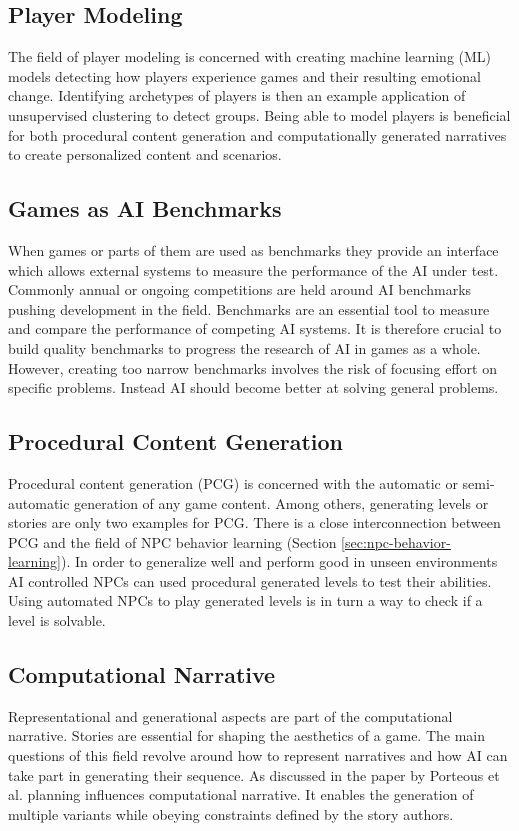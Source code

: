 \subsection{Player Modeling}
The field of player modeling is concerned with creating machine learning (ML) models detecting how players experience games and their resulting emotional change.
Identifying archetypes of players is then an example application of unsupervised clustering to detect groups.
Being able to model players is beneficial for both procedural content generation and computationally generated narratives to create personalized content and scenarios.

\subsection{Games as AI Benchmarks}
When games or parts of them are used as benchmarks they provide an interface which allows external systems to measure the performance of the AI under test.
Commonly annual or ongoing competitions are held around AI benchmarks pushing development in the field.
Benchmarks are an essential tool to measure and compare the performance of competing AI systems.
It is therefore crucial to build quality benchmarks to progress the research of AI in games as a whole.
However, creating too narrow benchmarks involves the risk of focusing effort on specific problems.
Instead AI should become better at solving general problems.

\subsection{Procedural Content Generation}
Procedural content generation (PCG) is concerned with the automatic or semi-automatic generation of any game content.
Among others, generating levels or stories are only two examples for PCG.
There is a close interconnection between PCG and the field of NPC behavior learning (Section \ref{sec:npc-behavior-learning}).
In order to generalize well and perform good in unseen environments AI controlled NPCs can used procedural generated levels to test their abilities.
Using automated NPCs to play generated levels is in turn a way to check if a level is solvable.

\subsection{Computational Narrative}
Representational and generational aspects are part of the computational narrative.
Stories are essential for shaping the aesthetics of a game.
The main questions of this field revolve around how to represent narratives and how AI can take part in generating their sequence.
As discussed in the paper by Porteous et al. \cite{Porteous2010} planning influences computational narrative.
It enables the generation of multiple variants while obeying constraints defined by the story authors.

